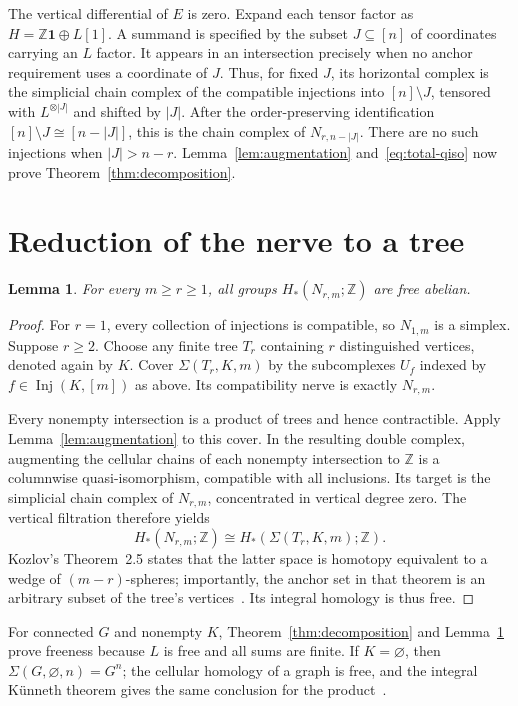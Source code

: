 \documentclass[11pt]{article}
\newtheorem{lemma}[theorem]{Lemma}
\newcommand{\Z}{\mathbb Z}
\newcommand{\inj}{\operatorname{Inj}}
\begin{document}
The vertical differential of $E$ is zero.  Expand each tensor factor as $H=\Z\mathbf1\oplus L[1]$.  A summand is specified by the subset $J\subseteq[n]$ of coordinates carrying an $L$ factor.  It appears in an intersection precisely when no anchor requirement uses a coordinate of $J$.  Thus, for fixed $J$, its horizontal complex is the simplicial chain complex of the compatible injections into $[n]\setminus J$, tensored with $L^{\otimes |J|}$ and shifted by $|J|$.  After the order-preserving identification $[n]\setminus J\cong[n-|J|]$, this is the chain complex of $N_{r,n-|J|}$.  There are no such injections when $|J|>n-r$.  Lemma~\ref{lem:augmentation} and~\eqref{eq:total-qiso} now prove Theorem~\ref{thm:decomposition}.

\section{Reduction of the nerve to a tree}

\begin{lemma}\label{lem:nerve-free}
For every $m\geq r\geq1$, all groups $H_*(N_{r,m};\Z)$ are free abelian.
\end{lemma}

\begin{proof}
For $r=1$, every collection of injections is compatible, so $N_{1,m}$ is a simplex.  Suppose $r\geq2$.  Choose any finite tree $T_r$ containing $r$ distinguished vertices, denoted again by $K$.  Cover $\Sigma(T_r,K,m)$ by the subcomplexes $U_f$ indexed by $f\in\inj(K,[m])$ as above.  Its compatibility nerve is exactly $N_{r,m}$.

Every nonempty intersection is a product of trees and hence contractible.  Apply Lemma~\ref{lem:augmentation} to this cover.  In the resulting double complex, augmenting the cellular chains of each nonempty intersection to $\Z$ is a columnwise quasi-isomorphism, compatible with all inclusions.  Its target is the simplicial chain complex of $N_{r,m}$, concentrated in vertical degree zero.  The vertical filtration therefore yields
\[
 H_*(N_{r,m};\Z)\cong H_*(\Sigma(T_r,K,m);\Z).
\]
Kozlov's Theorem~2.5 states that the latter space is homotopy equivalent to a wedge of $(m-r)$-spheres; importantly, the anchor set in that theorem is an arbitrary subset of the tree's vertices~\cite[Definition~2.4 and Theorem~2.5]{kozlov2023}.  Its integral homology is thus free.
\end{proof}

For connected $G$ and nonempty $K$, Theorem~\ref{thm:decomposition} and Lemma~\ref{lem:nerve-free} prove freeness because $L$ is free and all sums are finite.  If $K=\varnothing$, then $\Sigma(G,\varnothing,n)=G^n$; the cellular homology of a graph is free, and the integral K\"unneth theorem gives the same conclusion for the product~\cite[Theorem~3B.6]{hatcher2002}.
\end{document}

